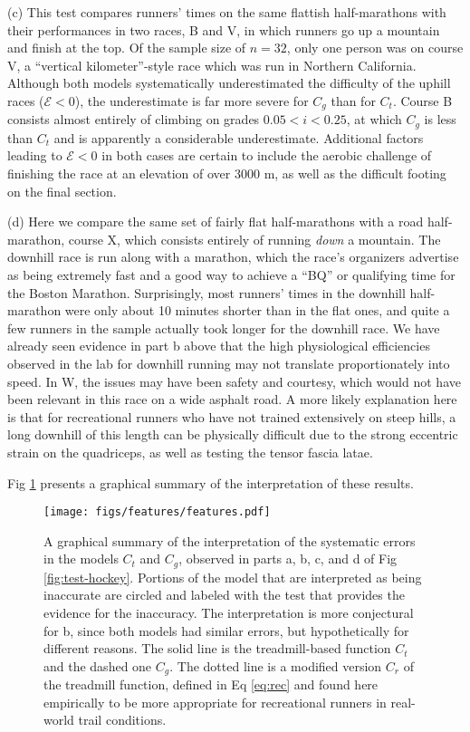 \documentclass[10pt,letterpaper]{article}
\begin{document}
(c) This test compares runners' times on the same flattish half-marathons with their performances in
two races, B and V, in which runners go up a mountain and finish at the top. Of the sample size of $n=32$, only
one person was on course V, a ``vertical kilometer''-style race which was run in Northern California.
Although both models systematically underestimated the difficulty of the uphill races ($\mathcal{E}<0$),
the underestimate is far more severe for $C_g$ than for $C_t$. Course B consists almost
entirely of climbing on grades $0.05<i<0.25$, at which $C_g$ is less than $C_t$ and is apparently a
considerable underestimate. Additional factors leading to $\mathcal{E}<0$ in both cases
are certain to include the aerobic challenge of finishing the race at an elevation of over 3000 m,
as well as the difficult footing on the final section.

(d) Here we compare the same set of fairly flat half-marathons with a road half-marathon, course X,
which consists entirely
of running \emph{down} a mountain. The downhill race is run along with a marathon, which
the race's organizers advertise as being extremely fast and a good way to achieve a ``BQ'' or
qualifying time for the Boston Marathon. Surprisingly, most runners' times in the downhill
half-marathon were only about 10 minutes shorter than in the flat ones, and quite a few runners in
the sample actually took longer for the downhill race. We have already seen evidence in part
b above that the high physiological efficiencies observed in the lab for downhill running may
not translate proportionately into speed. In W, the issues may have been safety and courtesy,
which would not have been relevant in this race on a wide asphalt road. A more likely explanation
here is that for recreational runners who have not trained extensively on steep hills, a long downhill of this
length can be physically difficult due to the strong eccentric strain on the quadriceps, as well as
testing the tensor fascia latae.

Fig \ref{fig:features} presents a graphical summary of the interpretation of these results.

\begin{figure}[h]
\texttt{[image: figs/features/features.pdf]}
\centering
\caption{A graphical summary of the interpretation of the systematic errors in the models $C_t$ and $C_g$, observed
in parts a, b, c, and d of Fig \ref{fig:test-hockey}. Portions of the model that are
interpreted as being inaccurate are circled and labeled with the test that provides the
evidence for the inaccuracy. The interpretation is more conjectural for b, since both
models had similar errors, but hypothetically for different reasons.
The solid line is the treadmill-based function $C_t$ and the dashed one $C_g$.
The dotted line is a modified version $C_r$ of the treadmill function, defined in Eq \ref{eq:rec} and found
here empirically to be more appropriate for recreational runners in real-world trail conditions.}
\label{fig:features}
\end{figure}
\end{document}
